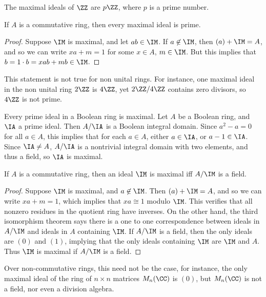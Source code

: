 \begin{example}
    The maximal ideals of $\ZZ$ are $p \ZZ$, where $p$ is a prime number.
\end{example}

\begin{theorem}
    If $A$ is a commutative ring, then every maximal ideal is prime.
\end{theorem}
\begin{proof}
    Suppose $\IM$ is maximal, and let $ab \in \IM$. If $a \not \in \IM$, then $(a) + \IM = A$, and so we can write $xa + m = 1$ for some $x \in A$, $m \in \IM$. But this implies that $b = 1 \cdot b = xab + mb \in \IM$.
\end{proof}

\begin{remark}
    This statement is not true for non unital rings. For instance, one maximal ideal in the non unital ring $2 \ZZ$ is $4\ZZ$, yet $2\ZZ / 4\ZZ$ contains zero divisors, so $4\ZZ$ is not prime.
\end{remark}

\begin{example}
    Every prime ideal in a Boolean ring is maximal. Let $A$ be a Boolean ring, and $\IA$ a prime ideal. Then $A/\IA$ is a Boolean integral domain. Since $a^2 - a = 0$ for all $a \in A$, this implies that for each $a \in A$, either $a \in \IA$, or $a - 1 \in \IA$. Since $\IA \neq A$, $A/\IA$ is a nontrivial integral domain with two elements, and thus a field, so $\IA$ is maximal.
\end{example}

\begin{theorem}
    If $A$ is a commutative ring, then an ideal $\IM$ is maximal iff $A/\IM$ is a field.
\end{theorem}
\begin{proof}
    Suppose $\IM$ is maximal, and $a \not \in \IM$. Then $(a) + \IM = A$, and so we can write $xa + m = 1$, which implies that $xa \cong 1$ modulo $\IM$. This verifies that all nonzero residues in the quotient ring have inverses. On the other hand, the third isomorphism theorem says there is a one to one correspondence between ideals in $A/\IM$ and ideals in $A$ containing $\IM$. If $A/\IM$ is a field, then the only ideals are $(0)$ and $(1)$, implying that the only ideals containing $\IM$ are $\IM$ and $A$. Thus $\IM$ is maximal if $A/\IM$ is a field.
\end{proof}

Over non-commutative rings, this need not be the case, for instance, the only maximal ideal of the ring of $n \times n$ matrices $M_n(\CC)$ is $(0)$, but $M_n(\CC)$ is not a field, nor even a division algebra.


